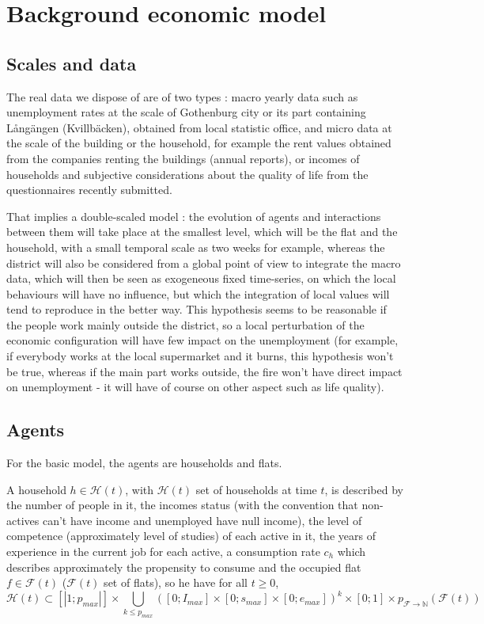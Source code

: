 \documentclass[english]{article}
\begin{document}
\section{Background economic model}


\subsection{Scales and data}

The real data we dispose of are of two types : macro yearly data such
as unemployment rates at the scale of Gothenburg city or its part
containing L{\aa}ngängen (Kvillbäcken), obtained from local statistic
office, and micro data at the scale of the building or the household,
for example the rent values obtained from the companies renting the
buildings (annual reports), or incomes of households and subjective
considerations about the quality of life from the questionnaires recently
submitted.

That implies a double-scaled model : the evolution of agents and interactions
between them will take place at the smallest level, which will be
the flat and the household, with a small temporal scale as two weeks
for example, whereas the district will also be considered from a global
point of view to integrate the macro data, which will then be seen
as exogeneous fixed time-series, on which the local behaviours will
have no influence, but which the integration of local values will
tend to reproduce in the better way. This hypothesis seems to be reasonable
if the people work mainly outside the district, so a local perturbation
of the economic configuration will have few impact on the unemployment
(for example, if everybody works at the local supermarket and it burns,
this hypothesis won't be true, whereas if the main part works outside,
the fire won't have direct impact on unemployment - it will have of
course on other aspect such as life quality).


\subsection{Agents}

For the basic model, the agents are households and flats.

A household $h\in\mathcal{H}(t)$, with $\mathcal{H}(t)$ set of households
at time $t$, is described by the number of people in it, the incomes
status (with the convention that non-actives can't have income and
unemployed have null income), the level of competence (approximately
level of studies) of each active in it, the years of experience in
the current job for each active, a consumption rate $c_{h}$ which
describes approximately the propensity to consume and the occupied
flat $f\in\mathcal{F}(t)$ ($\mathcal{F}(t)$ set of flats), so he
have for all $t\geq0$,
\[
\mathcal{H}(t)\subset\left[\left|1;p_{max}\right|\right]\times\bigcup_{k\leq p_{max}}([0;I_{max}]\times[0;s_{max}]\times[0;e_{max}])^{k}\times[0;1]\times p_{\mathcal{F\rightarrow\mathbb{N}}}(\mathcal{F}(t))
\]
\end{document}

